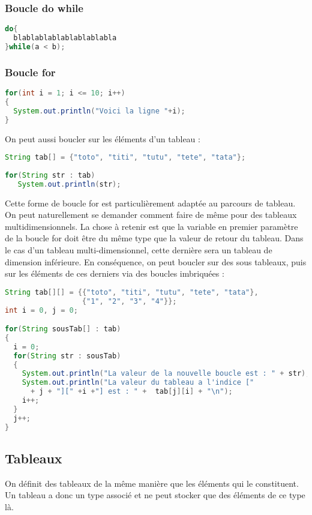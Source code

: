 \documentclass[a4paper,twoside]{article}
\begin{document}
\subsubsection{Boucle do while}
\begin{lstlisting}[language=java]
do{
  blablablablablablablabla
}while(a < b);
\end{lstlisting}

\subsubsection{Boucle for}
\begin{lstlisting}[language=java]
for(int i = 1; i <= 10; i++)
{
  System.out.println("Voici la ligne "+i);
}
\end{lstlisting}

\bigskip

On peut aussi boucler sur les éléments d'un tableau :
\begin{lstlisting}[language=java]
String tab[] = {"toto", "titi", "tutu", "tete", "tata"};
 
for(String str : tab)
   System.out.println(str);
\end{lstlisting}

Cette forme de boucle for est particulièrement adaptée au parcours de tableau. On peut naturellement se demander comment faire de même pour des tableaux multidimensionnels. La chose à retenir est que la variable en premier paramètre de la boucle for doit être du même type que la valeur de retour du tableau. Dans le cas d'un tableau multi-dimensionnel, cette dernière sera un tableau de dimension inférieure. En conséquence, on peut boucler sur des sous tableaux, puis sur les éléments de ces derniers via des boucles imbriquées :
\begin{lstlisting}[language=java]
String tab[][] = {{"toto", "titi", "tutu", "tete", "tata"}, 
                  {"1", "2", "3", "4"}};
int i = 0, j = 0;

for(String sousTab[] : tab)
{
  i = 0;
  for(String str : sousTab)
  {     
    System.out.println("La valeur de la nouvelle boucle est : " + str);
    System.out.println("La valeur du tableau a l'indice [" 
      + j + "][" +i +"] est : " +  tab[j][i] + "\n");
    i++;
  }
  j++;
}
\end{lstlisting}





\subsection{Tableaux}
On définit des tableaux de la même manière que les éléments qui le constituent. Un tableau a donc un type associé et ne peut stocker que des éléments de ce type là.
\end{document}
